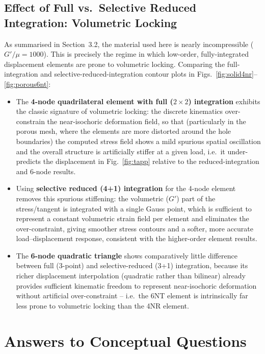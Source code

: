 \documentclass[11pt,a4paper]{article}
\begin{document}
\subsection{Effect of Full vs.\ Selective Reduced Integration: Volumetric Locking}
As summarised in Section~3.2, the material used here is nearly incompressible ($G'/\mu = 1000$). This is
precisely the regime in which low-order, fully-integrated displacement elements are prone to volumetric
locking. Comparing the full-integration and selective-reduced-integration contour plots in
Figs.~\ref{fig:solid4nr}--\ref{fig:porous6nt}:
\begin{itemize}
    \item The \textbf{4-node quadrilateral element with full ($2\times2$) integration} exhibits the
    classic signature of volumetric locking: the discrete kinematics over-constrain the near-isochoric
    deformation field, so that (particularly in the porous mesh, where the elements are more distorted
    around the hole boundaries) the computed stress field shows a mild spurious spatial oscillation and
    the overall structure is artificially stiffer at a given load, i.e.\ it under-predicts the
    displacement in Fig.~\ref{fig:tapp} relative to the reduced-integration and 6-node results.
    \item Using \textbf{selective reduced (4+1) integration} for the 4-node element removes this spurious
    stiffening: the volumetric ($G'$) part of the stress/tangent is integrated with a single Gauss point,
    which is sufficient to represent a constant volumetric strain field per element and eliminates the
    over-constraint, giving smoother stress contours and a softer, more accurate load--displacement
    response, consistent with the higher-order element results.
    \item The \textbf{6-node quadratic triangle} shows comparatively little difference between full
    (3-point) and selective-reduced (3+1) integration, because its richer displacement interpolation
    (quadratic rather than bilinear) already provides sufficient kinematic freedom to represent
    near-isochoric deformation without artificial over-constraint -- i.e.\ the 6NT element is intrinsically
    far less prone to volumetric locking than the 4NR element.
\end{itemize}

\section{Answers to Conceptual Questions}
\end{document}
